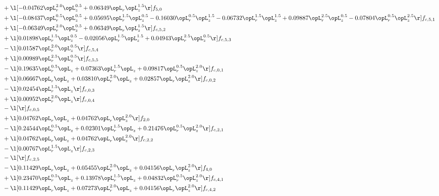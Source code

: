 \begin{alignat}{2}
& + \l[  -0.04762 \opL_r^{2.0} \opL_z^{0.5} +  0.06349 \opL_r \opL_z^{1.5}  \r] f_{5,0} \nonumber \\ 
& + \l[  -0.08437 \opL_r^{0.5} \opL_z^{0.5} +  0.05695 \opL_r^{1.5} \opL_z^{0.5}   -0.16030 \opL_r^{0.5} \opL_z^{1.5}   -0.06732 \opL_r^{1.5} \opL_z^{1.5} +  0.09887 \opL_r^{2.5} \opL_z^{0.5}   -0.07804 \opL_r^{0.5} \opL_z^{2.5}  \r] f_{c,5,1} \nonumber \\ 
& + \l[  -0.06349 \opL_r^{2.0} \opL_z^{0.5} +  0.06349 \opL_r \opL_z^{1.5}  \r] f_{c,5,2} \nonumber \\ 
& + \l[  0.01898 \opL_r^{1.5} \opL_z^{0.5}   -0.02056 \opL_r^{1.5} \opL_z^{1.5} +  0.04943 \opL_r^{2.5} \opL_z^{0.5}  \r] f_{c,5,3} \nonumber \\ 
& - \l[  0.01587 \opL_r^{2.0} \opL_z^{0.5}  \r] f_{c,5,4} \nonumber \\ 
& + \l[  0.00989 \opL_r^{2.5} \opL_z^{0.5}  \r] f_{c,5,5} \nonumber \\ 
& - \l[  0.19635 \opL_r^{0.5} \opL_z +  0.07363 \opL_r^{1.5} \opL_z +  0.09817 \opL_r^{0.5} \opL_z^{2.0}  \r] f_{c,0,1} \nonumber \\ 
& + \l[  0.06667 \opL_r \opL_z +  0.03810 \opL_r^{2.0} \opL_z +  0.02857 \opL_r \opL_z^{2.0}  \r] f_{c,0,2} \nonumber \\ 
& - \l[  0.02454 \opL_r^{1.5} \opL_z  \r] f_{c,0,3} \nonumber \\ 
& + \l[  0.00952 \opL_r^{2.0} \opL_z  \r] f_{c,0,4} \nonumber \\ 
& - \l[  \r] f_{c,0,5} \nonumber \\ 
& + \l[  0.04762 \opL_r \opL_z +  0.04762 \opL_r \opL_z^{2.0}  \r] f_{2,0} \nonumber \\ 
& - \l[  0.24544 \opL_r^{0.5} \opL_z +  0.02301 \opL_r^{1.5} \opL_z +  0.21476 \opL_r^{0.5} \opL_z^{2.0}  \r] f_{c,2,1} \nonumber \\ 
& + \l[  0.04762 \opL_r \opL_z +  0.04762 \opL_r \opL_z^{2.0}  \r] f_{c,2,2} \nonumber \\ 
& - \l[  0.00767 \opL_r^{1.5} \opL_z  \r] f_{c,2,3} \nonumber \\ 
& - \l[  \r] f_{c,2,5} \nonumber \\ 
& - \l[  0.11429 \opL_r \opL_z +  0.05455 \opL_r^{2.0} \opL_z +  0.04156 \opL_r \opL_z^{2.0}  \r] f_{4,0} \nonumber \\ 
& + \l[  0.23470 \opL_r^{0.5} \opL_z +  0.13978 \opL_r^{1.5} \opL_z +  0.04832 \opL_r^{0.5} \opL_z^{2.0}  \r] f_{c,4,1} \nonumber \\ 
& - \l[  0.11429 \opL_r \opL_z +  0.07273 \opL_r^{2.0} \opL_z +  0.04156 \opL_r \opL_z^{2.0}  \r] f_{c,4,2} \nonumber \\ 

\end{alignat}
